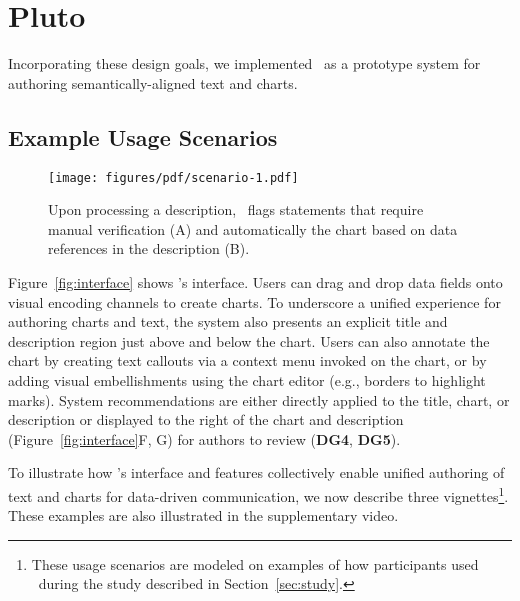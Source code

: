 \section{Pluto}

Incorporating these design goals, we implemented \pluto~as a prototype system for authoring semantically-aligned text and charts.

\subsection{Example Usage Scenarios}
\label{sec:scenarios}

\begin{figure}[t!]
    \centering
    \texttt{[image: figures/pdf/scenario-1.pdf]}
    \caption{Upon processing a description, \pluto~flags statements that require manual verification (A) and automatically  the chart based on data references in the description (B).}
    \label{fig:scenario-1}
\end{figure}

Figure~\ref{fig:interface} shows \pluto's interface.
Users can drag and drop data fields onto visual encoding channels to create charts.
To underscore a unified experience for authoring charts and text, the system also presents an explicit title and description region just above and below the chart.
Users can also annotate the chart by creating text callouts via a context menu invoked on the chart, or by adding visual embellishments using the chart editor (e.g., borders to highlight marks).
System recommendations are either directly applied to the title, chart, or description or displayed to the right of the chart and description (Figure~\ref{fig:interface}F, G) for authors to review (\textbf{DG4}, \textbf{DG5}).

To illustrate how \pluto's interface and features collectively enable unified authoring of text and charts for data-driven communication, we now describe three vignettes\footnote{These usage scenarios are modeled on examples of how participants used \pluto~during the study described in Section~\ref{sec:study}.}.
These examples are also illustrated in the supplementary video.

